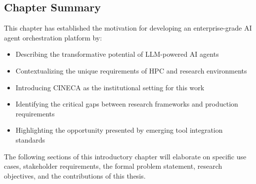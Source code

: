 \subsection{Chapter Summary}

This chapter has established the motivation for developing an enterprise-grade AI agent orchestration platform by:

\begin{itemize}
    \item Describing the transformative potential of LLM-powered AI agents
    \item Contextualizing the unique requirements of HPC and research environments
    \item Introducing CINECA as the institutional setting for this work
    \item Identifying the critical gaps between research frameworks and production requirements
    \item Highlighting the opportunity presented by emerging tool integration standards
\end{itemize}

The following sections of this introductory chapter will elaborate on specific use cases, stakeholder requirements, the formal problem statement, research objectives, and the contributions of this thesis.

